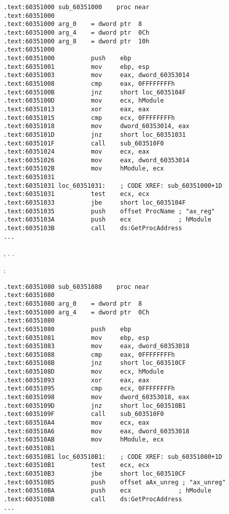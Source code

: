 %

\begin{lstlisting}
.text:60351000 sub_60351000    proc near
.text:60351000
.text:60351000 arg_0    = dword ptr  8
.text:60351000 arg_4    = dword ptr  0Ch
.text:60351000 arg_8    = dword ptr  10h
.text:60351000
.text:60351000          push    ebp
.text:60351001          mov     ebp, esp
.text:60351003          mov     eax, dword_60353014
.text:60351008          cmp     eax, 0FFFFFFFFh
.text:6035100B          jnz     short loc_6035104F
.text:6035100D          mov     ecx, hModule
.text:60351013          xor     eax, eax
.text:60351015          cmp     ecx, 0FFFFFFFFh
.text:60351018          mov     dword_60353014, eax
.text:6035101D          jnz     short loc_60351031
.text:6035101F          call    sub_603510F0
.text:60351024          mov     ecx, eax
.text:60351026          mov     eax, dword_60353014
.text:6035102B          mov     hModule, ecx
.text:60351031
.text:60351031 loc_60351031:    ; CODE XREF: sub_60351000+1D
.text:60351031          test    ecx, ecx
.text:60351033          jbe     short loc_6035104F
.text:60351035          push    offset ProcName ; "ax_reg"
.text:6035103A          push    ecx             ; hModule
.text:6035103B          call    ds:GetProcAddress
...
\end{lstlisting}

,  . 
 .

:

\begin{lstlisting}
.text:60351080 sub_60351080    proc near
.text:60351080
.text:60351080 arg_0    = dword ptr  8
.text:60351080 arg_4    = dword ptr  0Ch
.text:60351080
.text:60351080          push    ebp
.text:60351081          mov     ebp, esp
.text:60351083          mov     eax, dword_60353018
.text:60351088          cmp     eax, 0FFFFFFFFh
.text:6035108B          jnz     short loc_603510CF
.text:6035108D          mov     ecx, hModule
.text:60351093          xor     eax, eax
.text:60351095          cmp     ecx, 0FFFFFFFFh
.text:60351098          mov     dword_60353018, eax
.text:6035109D          jnz     short loc_603510B1
.text:6035109F          call    sub_603510F0
.text:603510A4          mov     ecx, eax
.text:603510A6          mov     eax, dword_60353018
.text:603510AB          mov     hModule, ecx
.text:603510B1
.text:603510B1 loc_603510B1:    ; CODE XREF: sub_60351080+1D
.text:603510B1          test    ecx, ecx
.text:603510B3          jbe     short loc_603510CF
.text:603510B5          push    offset aAx_unreg ; "ax_unreg"
.text:603510BA          push    ecx             ; hModule
.text:603510BB          call    ds:GetProcAddress
...
\end{lstlisting}

